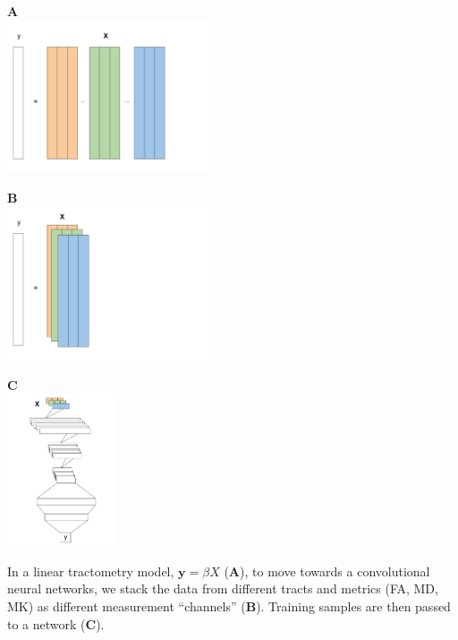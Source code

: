 \documentclass[a0paper,landscape,fontscale=0.395]{baposter}
\begin{document}
\begin{poster}
{\begin{minipage}[b]{1\linewidth}
    \large
    \begin{minipage}[b]{0.33\linewidth}
    \textbf{A}\\
    \includegraphics[height=4.5cm]{figures/linear-model.pdf}
    \end{minipage}
    \hspace{0.25cm}
    \begin{minipage}[b]{0.33\linewidth}
    \textbf{B}\\
    \includegraphics[height=4.5cm]{figures/linear-to-convnet.pdf}
    \end{minipage}
    \begin{minipage}[b]{0.33\linewidth}
    \textbf{C}\\
    \includegraphics[height=4.5cm]{figures/convnet-schematic.pdf}
    \end{minipage}
 \end{minipage}

In a linear tractometry model, $\textbf{y} = \beta X$ (\textbf{A}), to move towards a convolutional neural networks, we stack the data from different tracts and metrics (FA, MD, MK) as different measurement ``channels'' (\textbf{B}). Training samples are then passed to a network (\textbf{C}).
}


\end{poster}
\end{document}
